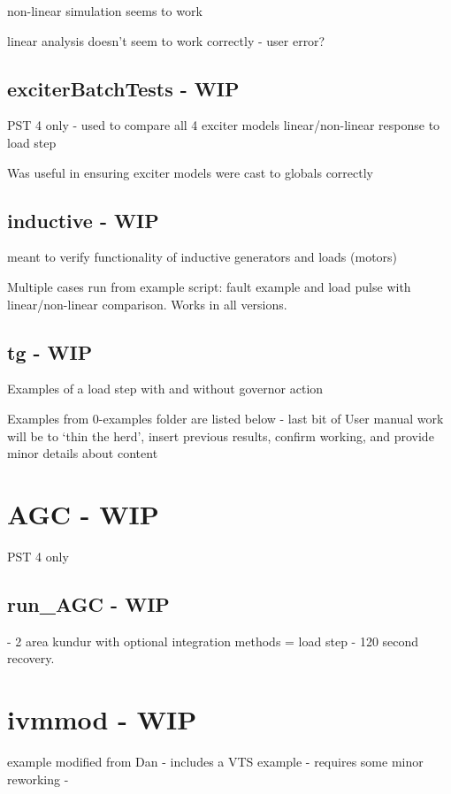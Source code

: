 non-linear simulation seems to work

linear analysis doesn't seem to work correctly - user error?

\subsection{exciterBatchTests - WIP}
PST 4 only - used to compare all 4 exciter models linear/non-linear response to load step

Was useful in ensuring exciter models were cast to globals correctly

\subsection{inductive - WIP}
meant to verify functionality of inductive generators and loads (motors)

Multiple cases run from example script: fault example and load pulse with linear/non-linear comparison.
Works in all versions.

\subsection{tg - WIP}
Examples of a load step with and without governor action

\pagebreak
Examples from 0-examples folder are listed below - last bit of User manual work will be to `thin the herd', insert previous results, confirm working, and provide minor details about content


\section{AGC - WIP}
PST 4 only

\subsection{run\_AGC - WIP}
- 2 area kundur with optional integration methods = load step - 120 second recovery.






\pagebreak



\pagebreak
\section{ivmmod - WIP}
example modified from Dan - includes a VTS example  -
requires some minor reworking - 

